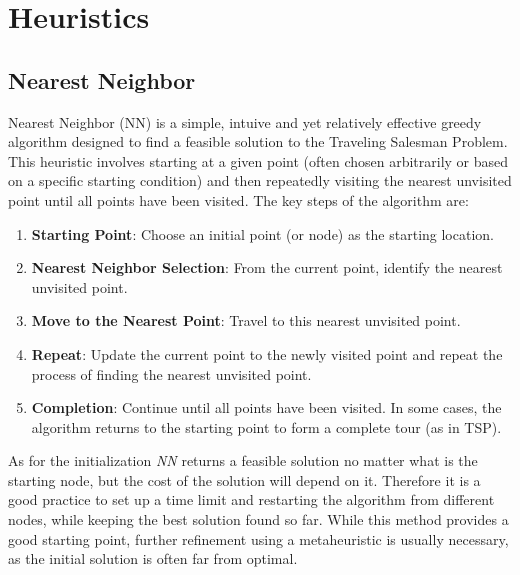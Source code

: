 \chapter{Heuristics}

\section{Nearest Neighbor}

Nearest Neighbor (NN) is a simple, intuive and yet relatively effective greedy algorithm designed to find a feasible solution to the Traveling Salesman Problem.
This heuristic involves starting at a given point (often chosen arbitrarily or based on a specific starting condition) and then repeatedly visiting the nearest unvisited point until all points have been visited.
The key steps of the algorithm are:

\begin{enumerate}
    \item \textbf{Starting Point}: Choose an initial point (or node) as the starting location.
    \item \textbf{Nearest Neighbor Selection}: From the current point, identify the nearest unvisited point.
    \item \textbf{Move to the Nearest Point}: Travel to this nearest unvisited point.
    \item \textbf{Repeat}: Update the current point to the newly visited point and repeat the process of finding the nearest unvisited point.
    \item \textbf{Completion}: Continue until all points have been visited. In some cases, the algorithm returns to the starting point to form a complete tour (as in TSP).
\end{enumerate}

As for the initialization \textit{NN} returns a feasible solution no matter what is the starting node, but the cost of the solution will depend on it.
Therefore it is a good practice to set up a time limit and restarting the algorithm from different nodes, while keeping the best solution found so far.
While this method provides a good starting point, further refinement using a metaheuristic is usually necessary, as the initial solution is often far from optimal.

